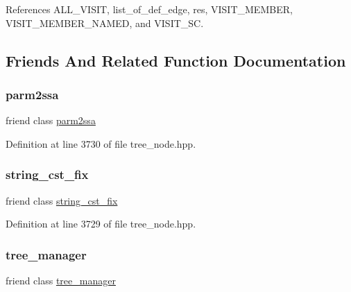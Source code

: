 References A\+L\+L\+\_\+\+V\+I\+S\+IT, list\+\_\+of\+\_\+def\+\_\+edge, res, V\+I\+S\+I\+T\+\_\+\+M\+E\+M\+B\+ER, V\+I\+S\+I\+T\+\_\+\+M\+E\+M\+B\+E\+R\+\_\+\+N\+A\+M\+ED, and V\+I\+S\+I\+T\+\_\+\+SC.



\subsection{Friends And Related Function Documentation}
\mbox{\label{structgimple__phi_a7460e57486405df5002c2882f504f969}} 
\subsubsection{\texorpdfstring{parm2ssa}{parm2ssa}}
{\footnotesize\ttfamily friend class \hyperlink{classparm2ssa}{parm2ssa}\hspace{0.3cm}{\ttfamily [friend]}}



Definition at line 3730 of file tree\+\_\+node.\+hpp.

\mbox{\label{structgimple__phi_a8f716225a40d3aa8c674489228ee74c5}} 
\subsubsection{\texorpdfstring{string\+\_\+cst\+\_\+fix}{string\_cst\_fix}}
{\footnotesize\ttfamily friend class \hyperlink{classstring__cst__fix}{string\+\_\+cst\+\_\+fix}\hspace{0.3cm}{\ttfamily [friend]}}



Definition at line 3729 of file tree\+\_\+node.\+hpp.

\mbox{\label{structgimple__phi_a254e84412a115167e85294af86ad8de7}} 
\subsubsection{\texorpdfstring{tree\+\_\+manager}{tree\_manager}}
{\footnotesize\ttfamily friend class \hyperlink{classtree__manager}{tree\+\_\+manager}\hspace{0.3cm}{\ttfamily [friend]}}



